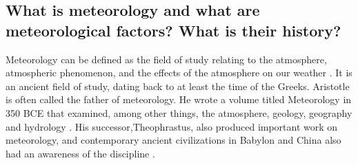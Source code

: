 

\subsection{What is meteorology and what are meteorological factors? What is their history?}






Meteorology can be defined as the field of study relating to the atmosphere, atmospheric phenomenon, and the effects of the atmosphere on our weather \citep{natgeodef}. It is an ancient field of study, dating back to at least the time of the Greeks. Aristotle is often called the father of meteorology. He wrote a volume titled Meteorology in 350 BCE that examined, among other things, the atmosphere, geology, geography and hydrology \citep{aristotle}. His successor,Theophrastus, also produced important work on meteorology, and contemporary ancient civilizations in Babylon and China also had an awareness of the discipline \citep{meteopastpresent}. 

